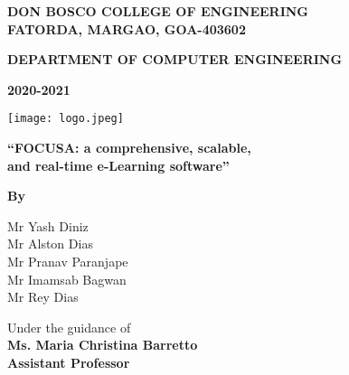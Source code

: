 \begin{titlepage}
    \begin{center}
        \Large
        \textbf{DON BOSCO COLLEGE OF ENGINEERING}\\
        \textbf{FATORDA, MARGAO, GOA-403602}

        \normalsize
        \textbf{DEPARTMENT OF COMPUTER ENGINEERING}\\

        \vspace*{0.4cm}
        
        \large
        \textbf{2020-2021}
        
        \texttt{[image: logo.jpeg]}

        \textbf{“FOCUSA: a comprehensive, scalable,\\
        and real-time e-Learning software”}

        \textbf{By}

        \normalsize
        Mr Yash Diniz\\
        Mr Alston Dias\\
        Mr Pranav Paranjape\\
        Mr Imamsab Bagwan\\
        Mr Rey Dias\\

        \vfill
        
        Under the guidance of\\
        \textbf{Ms. Maria Christina Barretto}\\
        \textbf{Assistant Professor}

    \end{center}
    
\end{titlepage}
